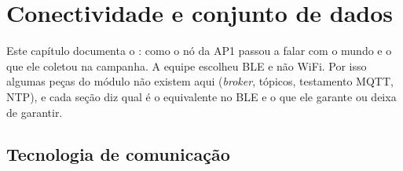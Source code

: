 \chapter{Conectividade e conjunto de dados}
\label{cap:conectividade}
\rubricaJustificativa

Este capítulo documenta o \moduloDoCiclo: como o nó da AP1 passou a
falar com o mundo e o que ele coletou na campanha. A equipe escolheu BLE
e não WiFi. Por isso algumas peças do módulo não existem aqui
(\emph{broker}, tópicos, testamento MQTT, NTP), e cada seção diz qual é o
equivalente no BLE e o que ele garante ou deixa de garantir.

\section{Tecnologia de comunicação}
\label{sec:tecnologia}
\rubricaJustificativa

